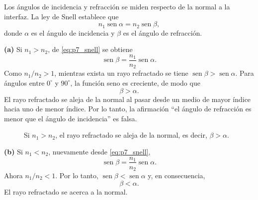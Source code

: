 \documentclass[11pt]{article}
\newcommand{\inciso}[1]{\vspace{0.35em}\noindent\textbf{(#1)}\enspace}
\newcommand{\sen}{\operatorname{sen}}
\begin{document}
Los \'angulos de incidencia y refracci\'on se miden respecto de la normal a la interfaz. La ley de Snell establece que
\begin{equation}
    n_1\sen\alpha=n_2\sen\beta,
    \label{eq:p7_snell}
\end{equation}
donde $\alpha$ es el \'angulo de incidencia y $\beta$ es el \'angulo de refracci\'on.

\inciso{a} Si $n_1>n_2$, de \eqref{eq:p7_snell} se obtiene
\begin{equation}
    \sen\beta=\frac{n_1}{n_2}\sen\alpha.
    \label{eq:p7_beta_mayor}
\end{equation}
Como $n_1/n_2>1$, mientras exista un rayo refractado se tiene $\sen\beta>\sen\alpha$. Para \'angulos entre $0^\circ$ y $90^\circ$, la funci\'on seno es creciente, de modo que
\begin{equation*}
    \beta>\alpha.
\end{equation*}
El rayo refractado se aleja de la normal al pasar desde un medio de mayor \'indice hacia uno de menor \'indice. Por lo tanto, la afirmaci\'on ``el \'angulo de refracci\'on es menor que el \'angulo de incidencia'' es falsa.

\begin{figure}[H]
\centering
{}
\caption{Si $n_1>n_2$, el rayo refractado se aleja de la normal, es decir, $\beta>\alpha$.}
\end{figure}

\inciso{b} Si $n_1<n_2$, nuevamente desde \eqref{eq:p7_snell},
\begin{equation}
    \sen\beta=\frac{n_1}{n_2}\sen\alpha.
    \label{eq:p7_beta_menor}
\end{equation}
Ahora $n_1/n_2<1$. Por lo tanto, $\sen\beta<\sen\alpha$ y, en consecuencia,
\begin{equation*}
    \beta<\alpha.
\end{equation*}
El rayo refractado se acerca a la normal.
\end{document}
